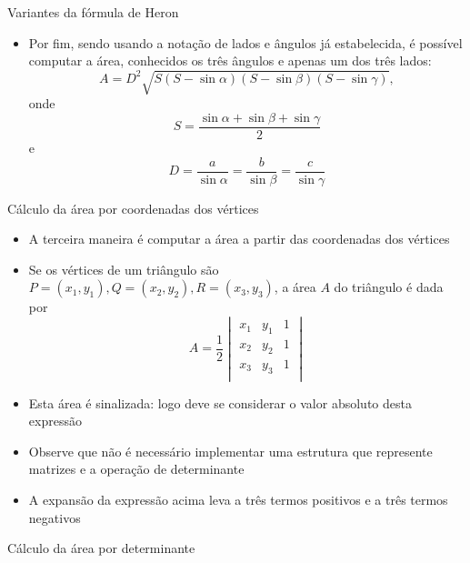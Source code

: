 \begin{frame}[fragile]{Variantes da fórmula de Heron}

    \begin{itemize}
        \item Por fim, sendo usando a notação de lados e ângulos já estabelecida, é possível computar a área, conhecidos os três ângulos e apenas um dos três lados:
        \[
            A = D^2\sqrt{S(S - \sin \alpha)(S - \sin \beta)(S - \sin \gamma)},
        \]
        onde
        \[
            S = \frac{\sin \alpha + \sin \beta + \sin \gamma}{2}
        \]
        e
        \[
            D = \frac{a}{\sin \alpha} = \frac{b}{\sin \beta} = \frac{c}{\sin \gamma}
        \]
    \end{itemize}

\end{frame}

\begin{frame}[fragile]{Cálculo da área por coordenadas dos vértices}

    \begin{itemize}
        \item A terceira maneira é computar a área a partir das coordenadas dos vértices

        \item Se os vértices de um triângulo são $P = (x_1, y_1), Q = (x_2, y_2), R = (x_3, y_3)$, 
            a área $A$ do triângulo é dada por
        \[
            A = \frac{1}{2}\begin{vmatrix}
                x_1 & y_1 & 1 \\
                x_2 & y_2 & 1 \\
                x_3 & y_3 & 1 \\
            \end{vmatrix}
        \]

        \item Esta área é sinalizada: logo deve se considerar o valor absoluto desta expressão

        \item Observe que não é necessário implementar uma estrutura que represente matrizes e
            a operação de determinante

        \item A expansão da expressão acima leva a três termos positivos e a três termos negativos
    \end{itemize}

\end{frame}

\begin{frame}[fragile]{Cálculo da área por determinante}
\end{frame}
